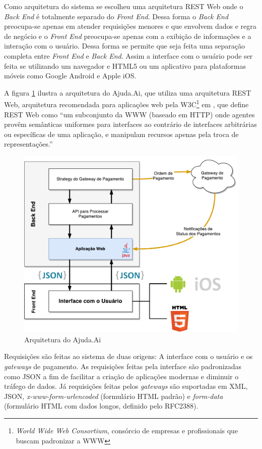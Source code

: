 Como arquitetura do sistema se escolheu uma arquitetura REST Web onde o \emph{Back End} é totalmente separado do \emph{Front End}. Dessa forma o \emph{Back End} preocupa-se apenas em atender requisições menores e que envolvem dados e regra de negócio e o \emph{Front End} preocupa-se apenas com a exibição de informações e a interação com o usuário. Dessa forma se permite que seja feita uma separação completa entre \emph{Front End} e \emph{Back End}. Assim a interface com o usuário pode ser feita se utilizando um navegador e HTML5 ou um aplicativo para plataformas móveis como Google Android e Apple iOS.

A figura \ref{fig:arquitetura} ilustra a arquitetura do Ajuda.Ai, que utiliza uma arquitetura REST Web, arquitetura recomendada para aplicações web pela W3C\footnote{\emph{World Wide Web Consortium}, consórcio de empresas e profissionais que buscam padronizar a WWW} em \cite{booth2004webservices}, que define REST Web como ``um subconjunto da WWW (baseado em HTTP) onde agentes provêm semânticas uniformes para interfaces ao contrário de interfaces arbitrárias ou específicas de uma aplicação, e manipulam recursos apenas pela troca de representações.''

\begin{figure}[H]
  \caption{\label{fig:arquitetura}Arquitetura do Ajuda.Ai}
  \centering
  \includegraphics[scale=0.7]{imagens/ajudaAi-arquitetura.pdf}
\end{figure}

Requisições são feitas ao sistema de duas origens: A interface com o usuário e os \emph{gateways} de pagamento. As requisições feitas pela interface são padronizadas como JSON a fim de facilitar a criação de aplicações modernas e diminuir o tráfego de dados. Já requisições feitas pelos \emph{gateways} são suportadas em XML, JSON, \emph{x-www-form-urlencoded} (formulário HTML padrão) e \emph{form-data} (formulário HTML com dados longos, definido pelo RFC2388).


